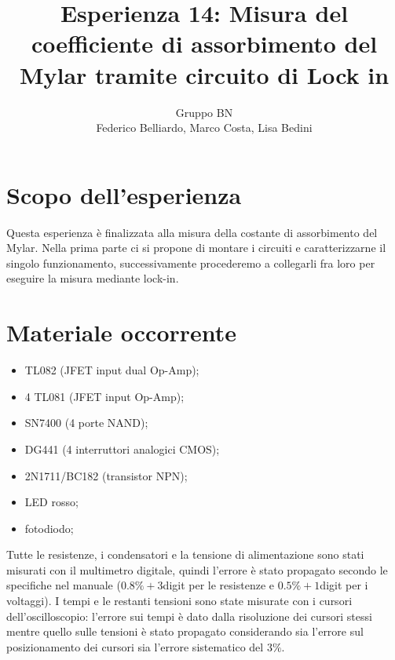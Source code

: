 \documentclass[10pt,a4paper]{article}
\author{Gruppo BN \\ Federico Belliardo, Marco Costa, Lisa Bedini}
\title{Esperienza 14: Misura del coefficiente di assorbimento del Mylar tramite circuito di Lock in}
\begin{document}
\maketitle
\section{Scopo dell'esperienza}
Questa esperienza è finalizzata alla misura della costante di assorbimento del Mylar. Nella prima parte ci si propone di montare i circuiti e caratterizzarne il singolo funzionamento, successivamente procederemo a collegarli fra loro per eseguire la misura mediante lock-in.


\section{Materiale occorrente}
\begin{itemize}
\item TL082 (JFET input dual Op-Amp);
\item 4 TL081 (JFET input Op-Amp);
\item SN7400 (4 porte NAND);
\item DG441 (4 interruttori analogici CMOS);
\item 2N1711/BC182 (transistor NPN);
\item LED rosso;
\item fotodiodo;
\end{itemize}


Tutte le resistenze, i condensatori e la tensione di alimentazione sono stati misurati con il multimetro digitale, quindi l'errore è stato propagato secondo le specifiche nel manuale ($0.8\% + 3$digit per le resistenze e $0.5\% + 1$digit per i voltaggi).
 I tempi e le restanti tensioni sono state misurate con i cursori dell'oscilloscopio: l'errore sui tempi è dato dalla risoluzione dei cursori stessi mentre quello sulle tensioni è stato propagato considerando sia l'errore sul posizionamento dei cursori sia l'errore sistematico del $3\%$.
\end{document}

